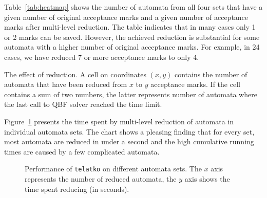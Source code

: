 \documentclass[runningheads]{llncs}
\newcommand{\telatko}{\texttt{telatko}\xspace}
\begin{document}
Table~\ref{tab:heatmap} shows the number of automata from all
four sets that have a given number of original acceptance marks and a
given number of acceptance marks after multi-level reduction. The
table indicates that in many cases only 1 or 2 marks can be
saved. However, the achieved reduction is substantial for some
automata with a higher number of original acceptance marks. For
example, in 24 cases, we have reduced 7 or more
acceptance marks to only 4.

\begin{table}[t]
\caption{The effect of reduction.
A cell on coordinates $(x,y)$ contains the number of automata that have been
reduced from $x$ to $y$ acceptance marks. If the cell contains a sum of two
numbers, the latter represents number of automata where the last call to QBF
solver reached the time limit.}
\label{tab:heatmap}
\setlength{\tabcolsep}{2.5pt}
\centering

\end{table}

Figure~\ref{fig:quantile} presents the time spent by multi-level
reduction of automata in individual automata sets. The chart shows a
pleasing finding that for every set, most automata are reduced in
under a second and the high cumulative running times are caused by
a few complicated automata.

\begin{figure}[b!]
\caption{Performance of \telatko on different automata sets. The $x$ axis
represents the number of reduced automata, the $y$ axis shows the time spent
reducing (in seconds).}
\label{fig:quantile}
\bigskip
\centering

\end{figure}



\end{document}
